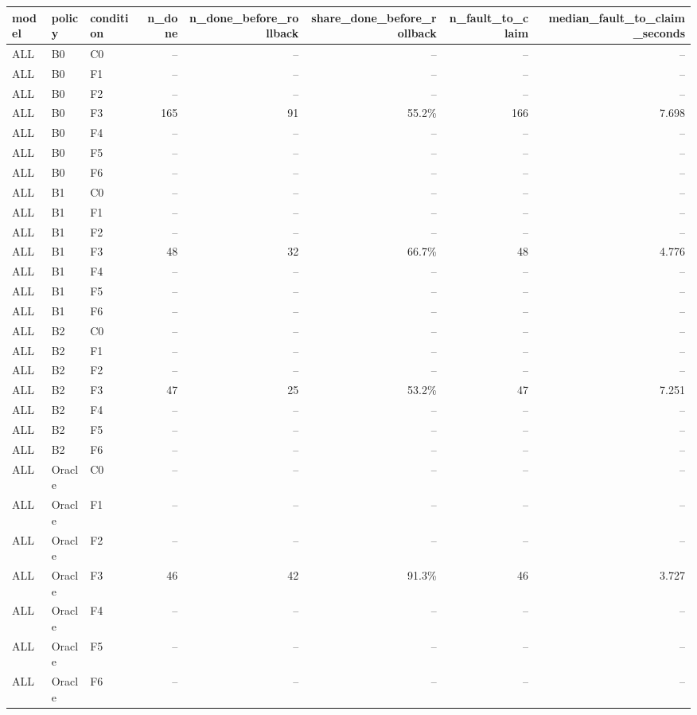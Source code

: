 \begin{tabular}{lllrrrrr}
\toprule
model & policy & condition & n\_done & n\_done\_before\_rollback & share\_done\_before\_rollback & n\_fault\_to\_claim & median\_fault\_to\_claim\_seconds \\
\midrule
ALL & B0 & C0 & -- & -- & -- & -- & -- \\
ALL & B0 & F1 & -- & -- & -- & -- & -- \\
ALL & B0 & F2 & -- & -- & -- & -- & -- \\
ALL & B0 & F3 & 165 & 91 & 55.2\% & 166 & 7.698 \\
ALL & B0 & F4 & -- & -- & -- & -- & -- \\
ALL & B0 & F5 & -- & -- & -- & -- & -- \\
ALL & B0 & F6 & -- & -- & -- & -- & -- \\
ALL & B1 & C0 & -- & -- & -- & -- & -- \\
ALL & B1 & F1 & -- & -- & -- & -- & -- \\
ALL & B1 & F2 & -- & -- & -- & -- & -- \\
ALL & B1 & F3 & 48 & 32 & 66.7\% & 48 & 4.776 \\
ALL & B1 & F4 & -- & -- & -- & -- & -- \\
ALL & B1 & F5 & -- & -- & -- & -- & -- \\
ALL & B1 & F6 & -- & -- & -- & -- & -- \\
ALL & B2 & C0 & -- & -- & -- & -- & -- \\
ALL & B2 & F1 & -- & -- & -- & -- & -- \\
ALL & B2 & F2 & -- & -- & -- & -- & -- \\
ALL & B2 & F3 & 47 & 25 & 53.2\% & 47 & 7.251 \\
ALL & B2 & F4 & -- & -- & -- & -- & -- \\
ALL & B2 & F5 & -- & -- & -- & -- & -- \\
ALL & B2 & F6 & -- & -- & -- & -- & -- \\
ALL & Oracle & C0 & -- & -- & -- & -- & -- \\
ALL & Oracle & F1 & -- & -- & -- & -- & -- \\
ALL & Oracle & F2 & -- & -- & -- & -- & -- \\
ALL & Oracle & F3 & 46 & 42 & 91.3\% & 46 & 3.727 \\
ALL & Oracle & F4 & -- & -- & -- & -- & -- \\
ALL & Oracle & F5 & -- & -- & -- & -- & -- \\
ALL & Oracle & F6 & -- & -- & -- & -- & -- \\

\end{tabular}
